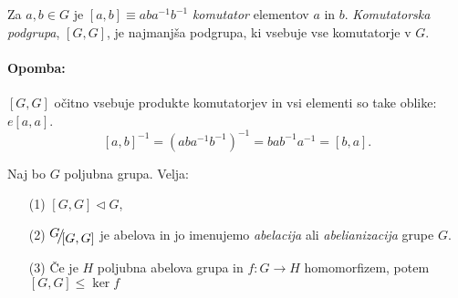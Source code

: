 \begin{defin}
	Za $a,b \in G$ je $[a,b] \equiv aba^{-1}b^{-1}$ \emph{komutator} elementov $a$ in $b$. \emph{Komutatorska podgrupa}, $[G,G]$, je najmanj\v sa podgrupa, ki vsebuje vse komutatorje
	v $G$.

	\paragraph{Opomba:} $[G,G]$ o\v citno vsebuje produkte komutatorjev in vsi elementi so take oblike: $e [a,a]$.
	\[
		[a,b]^{-1} = (aba^{-1}b^{-1})^{-1} = bab^{-1}a^{-1} = [b,a].
	\]
\end{defin}

\begin{trditev}
	Naj bo $G$ poljubna grupa. Velja:
	\begin{itemize}
		\item[(1)]{$[G,G] \lhd G$,}
		\item[(2)]{$\quot{G}{[G,G]}$ je abelova in jo imenujemo \emph{abelacija} ali \emph{abelianizacija} grupe $G$.}
		\item[(3)]{\v Ce je $H$ poljubna abelova grupa in $f : G \to H$ homomorfizem, potem $[G,G] \leq \ker f$}
	\end{itemize}
\end{trditev}

